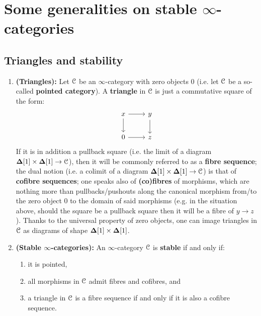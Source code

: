 \section{Some generalities on stable \texorpdfstring{$\infty$}{}-categories}
    \subsection{Triangles and stability}
        \begin{definition} \label{def: stable_infinity_categories} 
            
            \begin{enumerate}
                \item \textbf{(Triangles):} Let $\mathcal{C}$ be an $\infty$-category with zero objects $0$ (i.e. let $\mathcal{C}$ be a so-called \textbf{pointed category}). A \textbf{triangle} in $\mathcal{C}$ is just a commutative square of the form:
                    $$
                        \begin{tikzcd}
                            x & y \\
                            0 & z
                            \arrow[from=1-1, to=2-1]
                            \arrow[from=1-1, to=1-2]
                            \arrow[from=1-2, to=2-2]
                            \arrow[from=2-1, to=2-2]
                        \end{tikzcd}
                    $$
                If it is in addition a pullback square (i.e. the limit of a diagram $\simp[1] \x \simp[1] \to \C$), then it will be commonly referred to as a \textbf{fibre sequence}; the dual notion (i.e. a colimit of a diagram $\simp[1] \x \simp[1] \to \C$) is that of \textbf{cofibre sequences}; one speaks also of \textbf{(co)fibres} of morphisms, which are nothing more than pullbacks/pushouts along the canonical morphism from/to the zero object $0$ to the domain of said morphisms (e.g. in the situation above, should the square be a pullback square then it will be a fibre of $y \to z$). Thanks to the universal property of zero objects, one can image triangles in $\mathcal{C}$ as diagrams of shape $\simp[1] \x \simp[1]$.
                \item \textbf{(Stable $\infty$-categories):} An $\infty$-category $\mathcal{C}$ is \textbf{stable} if and only if:
                    \begin{enumerate}
                        \item it is pointed,
                        \item all morphisms in $\mathcal{C}$ admit fibres and cofibres, and
                        \item a triangle in $\mathcal{C}$ is a fibre sequence if and only if it is also a cofibre sequence.
                    \end{enumerate}
            \end{enumerate}
        \end{definition}
